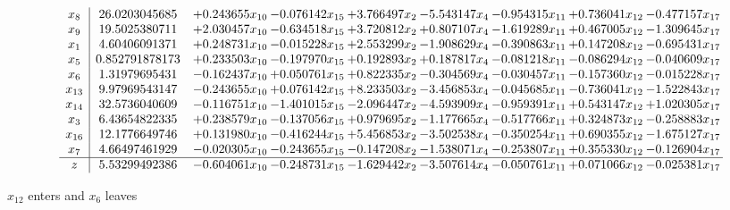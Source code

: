 \documentclass[10pt]{article}
\begin{document}
 \[\begin{array}{c| c c@{\hskip 2pt} c@{\hskip 2pt} c@{\hskip 2pt} c@{\hskip 2pt} c@{\hskip 2pt} c@{\hskip 2pt} c@{\hskip 2pt} }
 x_{8}   &  26.0203045685 & + 0.243655 x_{10} & -0.076142 x_{15} & + 3.766497 x_{2} & -5.543147 x_{4} & -0.954315 x_{11} & + 0.736041 x_{12} & -0.477157 x_{17}\\
 x_{9}   &  19.5025380711 & + 2.030457 x_{10} & -0.634518 x_{15} & + 3.720812 x_{2} & + 0.807107 x_{4} & -1.619289 x_{11} & + 0.467005 x_{12} & -1.309645 x_{17}\\
 x_{1}   &  4.60406091371 & + 0.248731 x_{10} & -0.015228 x_{15} & + 2.553299 x_{2} & -1.908629 x_{4} & -0.390863 x_{11} & + 0.147208 x_{12} & -0.695431 x_{17}\\
 x_{5}   &  0.852791878173 & + 0.233503 x_{10} & -0.197970 x_{15} & + 0.192893 x_{2} & + 0.187817 x_{4} & -0.081218 x_{11} & -0.086294 x_{12} & -0.040609 x_{17}\\
 x_{6}   &  1.31979695431 & -0.162437 x_{10} & + 0.050761 x_{15} & + 0.822335 x_{2} & -0.304569 x_{4} & -0.030457 x_{11} & -0.157360 x_{12} & -0.015228 x_{17}\\
 x_{13}   &  9.97969543147 & -0.243655 x_{10} & + 0.076142 x_{15} & + 8.233503 x_{2} & -3.456853 x_{4} & -0.045685 x_{11} & -0.736041 x_{12} & -1.522843 x_{17}\\
 x_{14}   &  32.5736040609 & -0.116751 x_{10} & -1.401015 x_{15} & -2.096447 x_{2} & -4.593909 x_{4} & -0.959391 x_{11} & + 0.543147 x_{12} & + 1.020305 x_{17}\\
 x_{3}   &  6.43654822335 & + 0.238579 x_{10} & -0.137056 x_{15} & + 0.979695 x_{2} & -1.177665 x_{4} & -0.517766 x_{11} & + 0.324873 x_{12} & -0.258883 x_{17}\\
 x_{16}   &  12.1776649746 & + 0.131980 x_{10} & -0.416244 x_{15} & + 5.456853 x_{2} & -3.502538 x_{4} & -0.350254 x_{11} & + 0.690355 x_{12} & -1.675127 x_{17}\\
 x_{7}   &  4.66497461929 & -0.020305 x_{10} & -0.243655 x_{15} & -0.147208 x_{2} & -1.538071 x_{4} & -0.253807 x_{11} & + 0.355330 x_{12} & -0.126904 x_{17}\\
\hline
z    &  5.53299492386 & -0.604061 x_{10} & -0.248731 x_{15} & -1.629442 x_{2} & -3.507614 x_{4} & -0.050761 x_{11} & + 0.071066 x_{12} & -0.025381 x_{17}\\
\end{array}\]


 $ x_{12} $ enters and $ x_{6} $ leaves 
\end{document}
